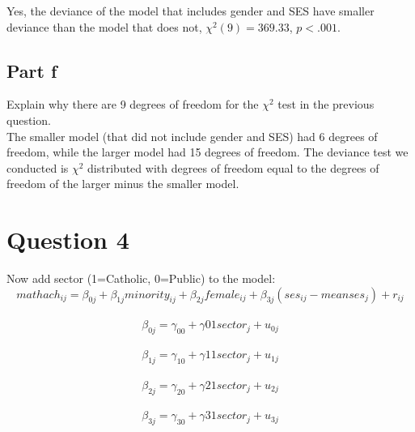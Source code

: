 \documentclass[]{article}
\begin{document}
Yes, the deviance of the model that includes gender and SES have smaller
deviance than the model that does not, \(\chi^2(9) = 369.33\),
\(p<.001\).

\subsection{Part f}\label{part-f}

Explain why there are 9 degrees of freedom for the \(\chi^2\) test in
the previous question.\\
The smaller model (that did not include gender and SES) had 6 degrees of
freedom, while the larger model had 15 degrees of freedom. The deviance
test we conducted is \(\chi^2\) distributed with degrees of freedom
equal to the degrees of freedom of the larger minus the smaller model.

\section{Question 4}\label{question-4}

Now add sector (1=Catholic, 0=Public) to the model:\\
\[mathach_{ij} = \beta_{0j} + \beta_{1j}minority_{ij} + \beta_{2j}female_{ij} + \beta_{3j}(ses_{ij}-meanses_{j}) + r_{ij}\]\\
\[\beta_{0j} = \gamma_{00} + \gamma{01}sector_j + u_{0j}\]\\
\[\beta_{1j} = \gamma_{10} + \gamma{11}sector_j + u_{1j}\]\\
\[\beta_{2j} = \gamma_{20} + \gamma{21}sector_j + u_{2j}\]\\
\[\beta_{3j} = \gamma_{30} + \gamma{31}sector_j + u_{3j}\]
\end{document}
